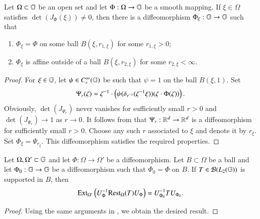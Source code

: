 \documentclass[leqno]{amsart}
\begin{document}
	
	\begin{lemma}\label{local equal}
		Let $\Omega\subset\mathbb{G}$ be an open set and let $\Phi:\Omega\to\mathbb{G}$ be a smooth mapping. If $\xi\in\Omega$ satisfies $\det(J_{\Phi}(\xi))\neq0$, then there is a diffeomorphism $\Phi_{\xi}:\mathbb{G}\to\mathbb{G}$ such that
		\begin{enumerate}[\rm(1)]
			\item $\Phi_{\xi}=\Phi$ on some ball $B(\xi,r_{1,\xi})$ for some $r_{1,\xi}>0$;
			\item $\Phi_{\xi}$ is affine outside of a ball $B(\xi,r_{2,\xi})$ for some $r_{2,\xi}<\infty$.
		\end{enumerate}
	\end{lemma}
	\begin{proof}
		For $\xi\in\mathbb{G}$, let $\psi\in C_{c}^{\infty}(\mathbb{G})$ be such that $\psi=1$ on the ball $B(\xi,1)$. Set $$\Psi_{r}(\zeta)=\zeta^{-1}\cdot\left(\psi(\delta_{r^{-1}}(\zeta^{-1}\xi))(\zeta\cdot\Phi(\zeta))\right).$$ 
		Obviously, $\det(J_{\Psi_{r}})$ never vanishes for sufficiently small $r>0$ and $\det(J_{\Psi_{r}})\to1$ as $r\to0$. It follows from \cite[Corollary 4.3]{Palais1959} that $\Psi_{r}:\mathbb{R}^{d}\to\mathbb{R}^{d}$ is a diffeomorphism for sufficiently small $r>0$. Choose any such $r$ associated to $\xi$ and denote it by $r_{\xi}$. Set $\Phi_{\xi}=\Psi_{r_{\xi}}$. This diffeomorphism satisfies the required properties.
	\end{proof}
	
	
	
	
	
	\begin{lemma}\label{local conjugate equal}
		Let $\Omega,\Omega'\subset\mathbb{G}$ and let $\Phi:\Omega\to\Omega'$ be a diffeomorphism. Let $B\subset\Omega$ be a ball and let $\Phi_{0}:\mathbb{G}\to\mathbb{G}$ be a diffeomorphism such that $\Phi_{0}=\Phi$ on $B$. If $T\in{\mathcal B}(L_{2}(\mathbb{G}))$ is supported in $B$, then
		$${\rm Ext}_{\Omega'}\left(U_{\Phi}^{-1}{\rm Rest}_{\Omega}(T) U_{\Phi}\right)=U_{\Phi_{0}}^{-1} T U_{\Phi_{0}}.$$
	\end{lemma}
	\begin{proof}
		Using the same arguments in \cite[Lemma 6.3]{DAO3}, we obtain the desired result.
		
	\end{proof}
	
\end{document}
